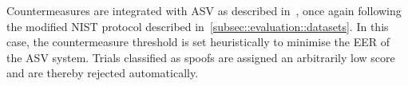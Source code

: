 Countermeasures are integrated with ASV as described in~\cite{Alegre2013a}, once again following the 
modified NIST protocol described in~\ref{subsec::evaluation::datasets}. In this case, the countermeasure threshold is set heuristically to minimise the EER of the ASV system.  Trials classified as spoofs are assigned an arbitrarily low score and are thereby rejected automatically.




